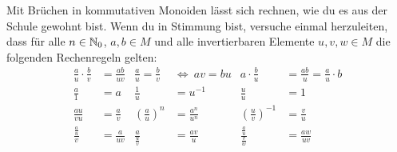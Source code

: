 \begin{bem}
    Mit Brüchen in kommutativen Monoiden lässt sich rechnen, wie du es aus der Schule gewohnt bist. Wenn du in Stimmung bist, versuche einmal herzuleiten, dass für alle $n\in \mathbb N_0$, $a,b\in M$ und alle invertierbaren Elemente $u,v,w\in M$ die folgenden Rechenregeln gelten:
    \begingroup
    \allowdisplaybreaks
    \begin{align*}
    \frac{a}{u}\cdot \frac{b}{v} & = \frac{ab}{uv} & \frac{a}{u}=\frac{b}{v}\ & \Leftrightarrow\ av=bu & a\cdot \frac{b}{u} & = \frac{ab}{u} = \frac{a}{u}\cdot b \\[0.5em]
    \frac{a}{1} & = a & \frac{1}{u} & = u^{-1} & \frac{u}{u} & = 1 \\[0.5em]
    \frac{au}{vu} & = \frac{a}{v} & \left(\frac{a}{u}\right)^n & = \frac{a^n}{u^n} & \left(\frac{u}{v}\right)^{-1} & = \frac{v}{u} \\[0.5em]
    \frac{\frac{a}{u}}{v} & = \frac{a}{uv} & \frac{a}{\frac{u}{v}} & = \frac{av}{u} & \frac{\frac{a}{u}}{\frac{v}{w}} & = \frac{aw}{uv}
    \end{align*}
    \endgroup
\end{bem}


